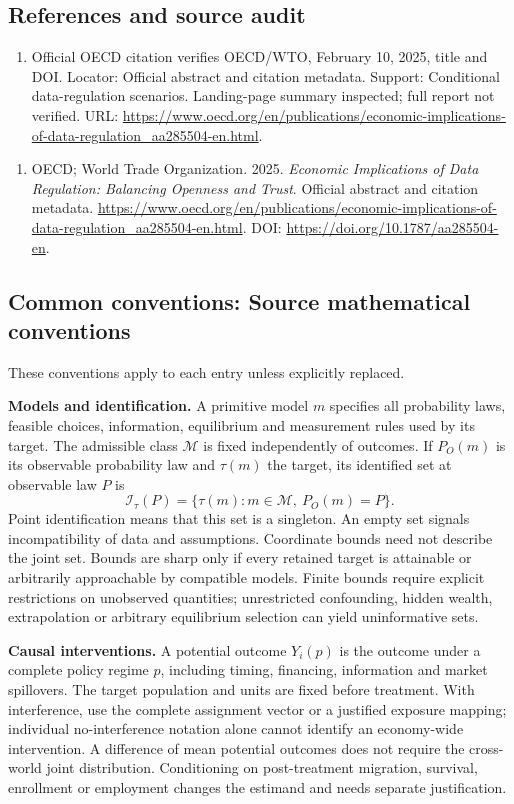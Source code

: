 \documentclass[11pt,a4paper]{article}
\begin{document}
\subsection*{References and source audit}
\begin{enumerate}
\item Official OECD citation verifies OECD/WTO, February 10, 2025, title and DOI. Locator: Official abstract and citation metadata. Support: Conditional data-regulation scenarios. Landing-page summary inspected; full report not verified. URL: \url{https://www.oecd.org/en/publications/economic-implications-of-data-regulation_aa285504-en.html}.
\end{enumerate}
\begin{enumerate}\raggedright
\item\hypertarget{definitions:source:30007629:1}{} OECD; World Trade Organization. 2025. \emph{Economic Implications of Data Regulation: Balancing Openness and Trust}. Official abstract and citation metadata.
\url{https://www.oecd.org/en/publications/economic-implications-of-data-regulation_aa285504-en.html}.
DOI: \url{https://doi.org/10.1787/aa285504-en}.
\end{enumerate}

\subsection*{Common conventions: Source mathematical conventions}

These conventions apply to each entry unless explicitly replaced.

\textbf{Models and identification.} A primitive model \(m\) specifies all probability laws, feasible choices, information, equilibrium and measurement rules used by its target. The admissible class \(\mathcal M\) is fixed independently of outcomes. If \(P_O(m)\) is its observable probability law and \(\tau(m)\) the target, its identified set at observable law \(P\) is
\[
 \mathcal I_\tau(P)=\{\tau(m):m\in\mathcal M,\ P_O(m)=P\}.
\]
Point identification means that this set is a singleton. An empty set signals incompatibility of data and assumptions. Coordinate bounds need not describe the joint set. Bounds are sharp only if every retained target is attainable or arbitrarily approachable by compatible models. Finite bounds require explicit restrictions on unobserved quantities; unrestricted confounding, hidden wealth, extrapolation or arbitrary equilibrium selection can yield uninformative sets.

\textbf{Causal interventions.} A potential outcome \(Y_i(p)\) is the outcome under a complete policy regime \(p\), including timing, financing, information and market spillovers. The target population and units are fixed before treatment. With interference, use the complete assignment vector or a justified exposure mapping; individual no-interference notation alone cannot identify an economy-wide intervention. A difference of mean potential outcomes does not require the cross-world joint distribution. Conditioning on post-treatment migration, survival, enrollment or employment changes the estimand and needs separate justification.
\end{document}
